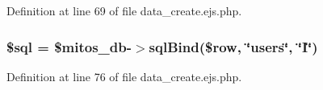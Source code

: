 \-Definition at line 69 of file data\-\_\-create.\-ejs.\-php.

\hypertarget{miscellaneous_2addressbook_2data__create_8ejs_8php_a047170d6020a882807665812a27e2525}{
\subsubsection[{\$sql}]{\setlength{\rightskip}{0pt plus 5cm}\$sql = \$mitos\-\_\-db-\/$>$sql\-Bind(\$row, \char`\"{}users\char`\"{}, \char`\"{}\-I\char`\"{})}}\label{miscellaneous_2addressbook_2data__create_8ejs_8php_a047170d6020a882807665812a27e2525}


\-Definition at line 76 of file data\-\_\-create.\-ejs.\-php.

